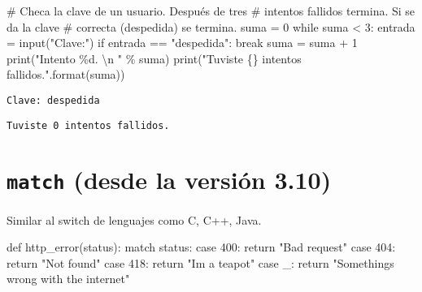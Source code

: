 \documentclass[
  letterpaper,
  DIV=11,
  numbers=noendperiod]{scrreprt}
\newenvironment{Shaded}{\begin{snugshade}}{\end{snugshade}}
\newcommand{\BuiltInTok}[1]{\textcolor[rgb]{0.00,0.23,0.31}{#1}}
\newcommand{\CharTok}[1]{\textcolor[rgb]{0.13,0.47,0.30}{#1}}
\newcommand{\CommentTok}[1]{\textcolor[rgb]{0.37,0.37,0.37}{#1}}
\newcommand{\ControlFlowTok}[1]{\textcolor[rgb]{0.00,0.23,0.31}{#1}}
\newcommand{\DecValTok}[1]{\textcolor[rgb]{0.68,0.00,0.00}{#1}}
\newcommand{\KeywordTok}[1]{\textcolor[rgb]{0.00,0.23,0.31}{#1}}
\newcommand{\NormalTok}[1]{\textcolor[rgb]{0.00,0.23,0.31}{#1}}
\newcommand{\OperatorTok}[1]{\textcolor[rgb]{0.37,0.37,0.37}{#1}}
\newcommand{\SpecialCharTok}[1]{\textcolor[rgb]{0.37,0.37,0.37}{#1}}
\newcommand{\StringTok}[1]{\textcolor[rgb]{0.13,0.47,0.30}{#1}}
\begin{document}
\begin{Shaded}
\begin{Highlighting}[]
\CommentTok{\# Checa la clave de un usuario. Después de tres}
\CommentTok{\# intentos fallidos termina. Si se da la clave}
\CommentTok{\# correcta (despedida) se termina.}
\NormalTok{suma }\OperatorTok{=} \DecValTok{0}
\ControlFlowTok{while}\NormalTok{ suma }\OperatorTok{\textless{}} \DecValTok{3}\NormalTok{:}
\NormalTok{    entrada }\OperatorTok{=} \BuiltInTok{input}\NormalTok{(}\StringTok{"Clave:"}\NormalTok{)}
    \ControlFlowTok{if}\NormalTok{ entrada }\OperatorTok{==} \StringTok{"despedida"}\NormalTok{:}
        \ControlFlowTok{break}
\NormalTok{    suma }\OperatorTok{=}\NormalTok{ suma }\OperatorTok{+} \DecValTok{1}
    \BuiltInTok{print}\NormalTok{(}\StringTok{"Intento }\SpecialCharTok{\%d}\StringTok{. }\CharTok{\textbackslash{}n}\StringTok{ "} \OperatorTok{\%}\NormalTok{ suma)}
\BuiltInTok{print}\NormalTok{(}\StringTok{"Tuviste }\SpecialCharTok{\{\}}\StringTok{ intentos fallidos."}\NormalTok{.}\BuiltInTok{format}\NormalTok{(suma))}
\end{Highlighting}
\end{Shaded}

\begin{verbatim}
Clave: despedida
\end{verbatim}

\begin{verbatim}
Tuviste 0 intentos fallidos.
\end{verbatim}


\chapter{\texorpdfstring{\texttt{match} (desde la versión
3.10)}{match (desde la versión 3.10)}}\label{match-desde-la-versiuxf3n-3.10}

Similar al switch de lenguajes como C, C++, Java.

\begin{Shaded}
\begin{Highlighting}[]
\KeywordTok{def}\NormalTok{ http\_error(status):}
    \ControlFlowTok{match}\NormalTok{ status:}
        \ControlFlowTok{case} \DecValTok{400}\NormalTok{:}
            \ControlFlowTok{return} \StringTok{"Bad request"}
        \ControlFlowTok{case} \DecValTok{404}\NormalTok{:}
            \ControlFlowTok{return} \StringTok{"Not found"}
        \ControlFlowTok{case} \DecValTok{418}\NormalTok{:}
            \ControlFlowTok{return} \StringTok{"I\textquotesingle{}m a teapot"}
        \ControlFlowTok{case}\NormalTok{ \_:}
            \ControlFlowTok{return} \StringTok{"Something\textquotesingle{}s wrong with the internet"}
\end{Highlighting}
\end{Shaded}
\end{document}

